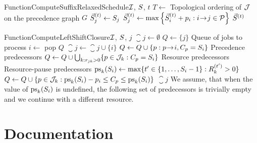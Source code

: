 \begin{alg}{Function}{ComputeSuffixRelaxedSchedule}{$\mathcal{I}$, $S$, $t$} \label{alg:suffix-relaxed-schedule}
\State $T \gets $ Topological ordering of $\mathcal{J}$ on the precedence graph $G$
        \State $\vec{S}^{(t)}_{j} \gets S_{j}$
    \Else
        \State $\vec{S}^{(t)}_{j} \gets \max\left\{\vec{S}^{(t)}_{i} + p_{i} : i \hspace{-0.2em} \rightarrow \hspace{-0.2em} j \in \mathcal{P} \right\}$
    \EndIf
\EndFor
\State \Return $\vec{S}^{(t)}$
\end{alg}

\newpage
\begin{alg}{Function}{ComputeLeftShiftClosure}{$\mathcal{I}$, $S$, $j$} \label{alg:left-shift-closure}
\State $\closure{j} \gets \emptyset$
\State $Q \gets \{j\}$ \Comment Queue of jobs to process
    \State $i \gets$ pop $Q$
    \State $\closure{j} \gets \closure{j} \cup \{ i \}$
    \State $Q \gets Q \cup \{ p : p \hspace{-0.2em} \rightarrow \hspace{-0.2em} i, C_{p} = S_{i}\}$
        \Comment Precedence predecessors
    \State $Q \gets Q \cup \bigcup_{k: r_{j k} > 0}\{ p \in \mathcal{J}_{k} : C_{p} = S_{i} \}$
        \Comment Resource predecessors
        \Comment Resource-pause predecessors
        \State $\mathrm{ps}_k(\jobstart{i}) \gets \max\{t^\prime \in \intinterval{1}{\jobstart{i}-1} : \capacity{k}{t^\prime} > 0\}$
        \State $Q \gets Q \cup \{ p \in \mathcal{J}_{k} : \mathrm{ps}_k(S_{i}) - p_{i} \leq C_{p} \leq \mathrm{ps}_k(S_{i}) \}$
    \EndFor
\EndWhile
\State \Return $\closure{j}$
\Statex
\Note  We assume, that when the value of $\mathrm{ps}_k(S_{i})$ is undefined,
       the following set of predecessors
\Notec is trivially empty and we continue with a different resource.
\end{alg}

\section{Documentation} \label{sec:attachments/documentation}


